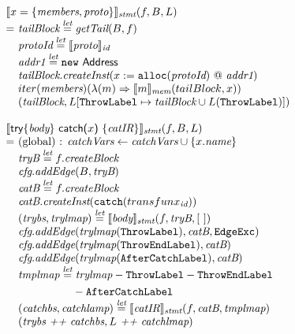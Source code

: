 \[\begin{array}{l@{}l@{~}l}
\lefteqn{\transfun{\irobject{x}{\emph{members}, \emph{proto}}}_{\emph{stmt}}(f, B, L)}\\
& = & \emph{tailBlock} \letval \getTail(B, f)\\
& & \emph{protoId} \letval \transfun{\emph{proto}}_{\emph{id}}\\
& & \emph{addr1} \letval \new\ \Address\\
& & \emph{tailBlock}.\emph{createInst}(x := \TT{alloc}(\emph{protoId}) ~@~ \emph{addr1})\\
& & iter(\emph{members})(\lambda(m) \Rightarrow \transfun{m}_{\emph{mem}}(tailBlock, x))\\
& & (\emph{tailBlock}, L[\ThrowLabel \mapsto \emph{tailBlock} \cup L(\ThrowLabel)])\\
& & \\

\lefteqn{\transfun{\ircfgtrycat{\emph{body}}{x}{\emph{catIR}}}_{\emph{stmt}}(f, B, L)}\\
& = & \text{(global) : } \emph{catchVars} \leftarrow \emph{catchVars} \cup \{ x.\emph{name} \}\\
& & \emph{tryB} \letval f.\emph{createBlock}\\
& & \emph{cfg}.\emph{addEdge}(B, \emph{tryB})\\
& & \emph{catB} \letval f.\emph{createBlock}\\
& & \emph{catB}.\emph{createInst}(\TT{catch}(transfun{x}_{\emph{id}}))\\
& & (\emph{trybs}, \emph{trylmap}) \letval \transfun{\emph{body}}_{\emph{stmt}}(f, \emph{tryB}, [\ ])\\
& & \emph{cfg}.\emph{addEdge}(\emph{trylmap}(\ThrowLabel), \emph{catB}, \EdgeExc)\\
& & \emph{cfg}.\emph{addEdge}(\emph{trylmap}(\ThrowEndLabel), \emph{catB})\\
& & \emph{cfg}.\emph{addEdge}(\emph{trylmap}(\AfterCatchLabel), \emph{catB})\\
& & \emph{tmplmap} \letval \emph{trylmap} - \ThrowLabel - \ThrowEndLabel\\
&& \phantom{\emph{tmplmap} \letval} - \AfterCatchLabel\\
& & (\emph{catchbs}, \emph{catchlamp}) \letval \transfun{\emph{catIR}}_{\emph{stmt}}(f, \emph{catB}, \emph{tmplmap})\\
& & (\emph{trybs} ~\emph{++}~ \emph{catchbs}, L ~\emph{++}~ \emph{catchlmap})\\
& & \\
\end{array}
\]

